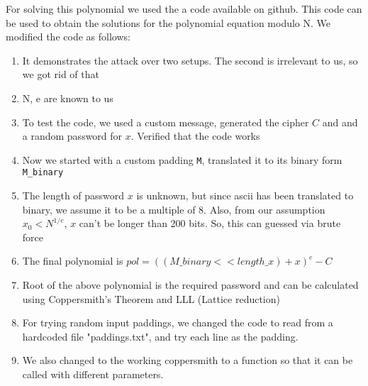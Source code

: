 \documentclass[11pt]{article}
\begin{document}
For solving this polynomial we used the a code available on github\cite{github}. This code can be used to obtain the solutions for the polynomial equation modulo N. We modified the code as follows:
\begin{enumerate}
    \item It demonstrates the attack over two setups. The second is irrelevant to us, so we got rid of that
    \item N, e are known to us
    \item To test the code, we used a custom message, generated the cipher $C$ and and a random password for $x$. Verified that the code works
    \item Now we started with a custom padding \texttt{M}, translated it to its binary form \texttt{M\_binary}
    \item The length of password $x$ is unknown, but since ascii has been translated to binary, we assume it to be a multiple of 8. Also, from our assumption $x_0 < N^{1/e}$, $x$ can't be longer than 200 bits. So, this can guessed via brute force
    \item The final polynomial is $pol = ((M\_binary<<length\_x) + x)^e - C$
    \item Root of the above polynomial is the required password and can be calculated using Coppersmith's Theorem and LLL (Lattice reduction)
    \item For trying random input paddings, we changed the code to read from a hardcoded file "paddings.txt", and try each line as the padding.
    \item We also changed to the working coppersmith to a function so that it can be called with different parameters.
\end{enumerate}
\end{document}
